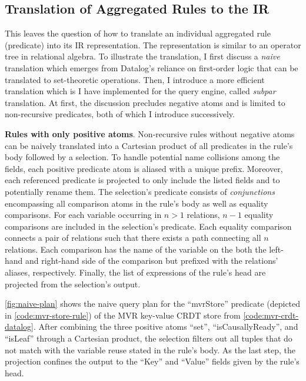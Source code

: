 \subsection{Translation of Aggregated Rules to the \acs{IR}}

This leaves the question of how to translate an individual aggregated rule
(predicate) into its \ac{IR} representation.
The representation is similar to an operator tree in relational algebra.
To illustrate the translation, I first discuss a \emph{naive} translation
which emerges from Datalog's reliance on first-order logic that can be
translated to set-theoretic operations.
Then, I introduce a more efficient translation which is I have implemented
for the query engine, called \emph{subpar} translation.
At first, the discussion precludes negative atoms and is limited to
non-recursive predicates, both of which I introduce successively.

\textbf{Rules with only positive atoms}.
Non-recursive rules without negative atoms can be naively translated
into a Cartesian product of all predicates in the rule's body followed by
a selection.
To handle potential name collisions among the fields,
each positive predicate atom is aliased with a unique prefix.
Moreover, each referenced predicate is projected to only include the listed
fields and to potentially rename them.
The selection's predicate consists of \emph{conjunctions}
encompassing all comparison atoms in the rule's body as well as equality comparisons.
For each variable occurring in \(n > 1\) relations, \(n - 1\) equality comparisons
are included in the selection's predicate.
Each equality comparison connects a pair of relations such that there exists
a path connecting all \(n\) relations.
Each comparison has the name of the variable on the both the left-hand and right-hand
side of the comparison but prefixed with the relations' aliases, respectively.
Finally, the list of expressions of the rule's head are projected from the
selection's output.

\ref{fig:naive-plan} shows the naive query plan for the ``mvrStore'' predicate
(depicted in \ref{code:mvr-store-rule})
of the \ac{MVR} key-value \ac{CRDT} store from \ref{code:mvr-crdt-datalog}.
After combining the three positive atoms ``set'', ``isCausallyReady'', and
``isLeaf'' through a Cartesian product, the selection filters out all tuples that
do not match with the variable reuse stated in the rule's body.
As the last step, the projection confines the output to the ``Key'' and ``Value''
fields given by the rule's head.

